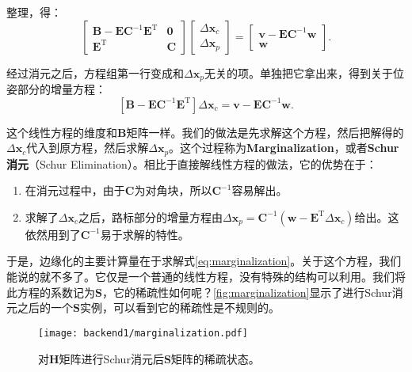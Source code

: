 整理，得：
\begin{equation}
\left[ \begin{matrix}
\bm{B} - \bm{E}\bm{C}^{-1}\bm{E}^\mathrm{T}	& 	\bm{0} \\
\bm{E}^\mathrm{T}							& 	\bm{C}
\end{matrix} \right]
\left[ \begin{array}{l}
\Delta \bm{x}_c \\
\Delta \bm{x}_p 
\end{array} \right] = 
\left[\begin{array}{l}
\bm{v} - \bm{E}\bm{C}^{-1}\bm{w}  \\
\bm{w}
\end{array}\right].
\end{equation}

经过消元之后，方程组第一行变成和$\Delta \bm{x}_p$无关的项。单独把它拿出来，得到关于位姿部分的增量方程：
\begin{equation}\label{eq:marginalization}
\left[ 
\bm{B} - \bm{E}\bm{C}^{-1}\bm{E}^\mathrm{T}
\right]
\Delta \bm{x}_c  = 
\bm{v} - \bm{E}\bm{C}^{-1}\bm{w} .
\end{equation}

这个线性方程的维度和$\bm{B}$矩阵一样。我们的做法是先求解这个方程，然后把解得的$\Delta \bm{x}_c$代入到原方程，然后求解$\Delta \bm{x}_p$。这个过程称为\textbf{Marginalization}\textsuperscript{\cite{Sibley2010}}，或者\textbf{Schur消元}（Schur Elimination）。相比于直接解线性方程的做法，它的优势在于：

\begin{enumerate}
	\item 在消元过程中，由于$\bm{C}$为对角块，所以$\bm{C}^{-1}$容易解出。
	\item 求解了$\Delta \bm{x}_c$之后，路标部分的增量方程由$\Delta \bm{x}_p = \bm{C}^{-1} (\bm{w} - \bm{E}^\mathrm{T} \Delta \bm{x}_c)$给出。这依然用到了$\bm{C}^{-1}$易于求解的特性。
\end{enumerate}

于是，边缘化的主要计算量在于求解式\eqref{eq:marginalization}。关于这个方程，我们能说的就不多了。它仅是一个普通的线性方程，没有特殊的结构可以利用。我们将此方程的系数记为$\bm{S}$，它的稀疏性如何呢？\autoref{fig:marginalization}显示了进行Schur消元之后的一个$\bm{S}$实例，可以看到它的稀疏性是不规则的。

\clearpage
\begin{figure}[!ht]
	\centering
	\texttt{[image: backend1/marginalization.pdf]}
	\caption{对$\bm{H}$矩阵进行Schur消元后$\bm{S}$矩阵的稀疏状态。}
	\label{fig:marginalization}
\end{figure}

